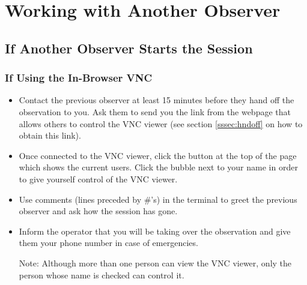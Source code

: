 \documentclass[11pt, reqno, tbtags]{article}
\begin{document}

\section{Working with Another Observer}\label{sec:share} %

\subsection{If Another Observer Starts the Session} %

 \subsubsection{If Using the In-Browser VNC} \begin{itemize}
 \item Contact the previous observer at least 15 minutes before they hand off the observation to you. Ask them to send you the link from the webpage that allows others to control the VNC viewer (see section \ref{sssec:hndoff} on how to obtain this link).
 \item Once connected to the VNC viewer, click the button at the top of the page which shows the current users. Click the bubble next to your name in order to give yourself control of the VNC viewer. 
 \item Use comments (lines preceded by \#'s) in the terminal to greet the previous observer and ask how the session has gone.  
 \item Inform the operator that you will be taking over the observation and give them your phone number in case of emergencies.  

 Note: Although more than one person can view the VNC viewer, only the person whose name is checked can control it.
\end{itemize}
\end{document}
